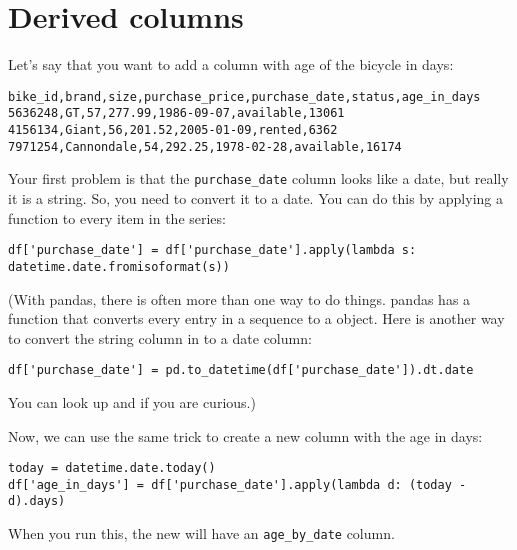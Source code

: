 \section{Derived columns}

Let's say that you want to add a column with age of the bicycle in days:
\begin{Verbatim}
bike_id,brand,size,purchase_price,purchase_date,status,age_in_days
5636248,GT,57,277.99,1986-09-07,available,13061
4156134,Giant,56,201.52,2005-01-09,rented,6362
7971254,Cannondale,54,292.25,1978-02-28,available,16174
\end{Verbatim}

Your first problem is that the \texttt{purchase\_date} column looks
like a date, but really it is a string. So, you need to convert it to a
date.  You can do this by applying a function to every item in the series:
\begin{Verbatim}
df['purchase_date'] = df['purchase_date'].apply(lambda s: datetime.date.fromisoformat(s))
\end{Verbatim}

(With pandas, there is often more than one way to do things.  pandas
has a  function that converts every entry in
a sequence to a  object. Here is another way to
convert the string column in to a date column:
\begin{Verbatim}
df['purchase_date'] = pd.to_datetime(df['purchase_date']).dt.date
\end{Verbatim}
You can look up  and  if you are curious.)

Now, we can use the same trick to create a new column with the age in days:
\begin{Verbatim}
today = datetime.date.today()
df['age_in_days'] = df['purchase_date'].apply(lambda d: (today - d).days)
\end{Verbatim}

When you run this, the new  will have an \texttt{age\_by\_date} column.






